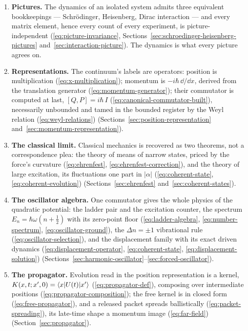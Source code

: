 \begin{enumerate}
    \item[\textbf{(P1)}] \textbf{Pictures.} The dynamics of an isolated system admits three equivalent bookkeepings --- Schr\"odinger, Heisenberg, Dirac interaction --- and every matrix element, hence every count of every experiment, is picture-independent (\eqref{eq:picture-invariance}, Sections~\ref{sec:schroedinger-heisenberg-pictures} and~\ref{sec:interaction-picture}). The dynamics is what every picture agrees on.
    \item[\textbf{(P2)}] \textbf{Representations.} The continuum's labels are operators: position is multiplication (\eqref{eq:x-multiplication}); momentum is $-i\hbar\,\dd/\dd x$, derived from the translation generator (\eqref{eq:momentum-generator}); their commutator is computed at last, $[Q,P] = i\hbar\,I$ (\eqref{eq:canonical-commutator-built}), necessarily unbounded and tamed in the bounded register by the Weyl relation (\eqref{eq:weyl-relations}) (Sections~\ref{sec:position-representation} and~\ref{sec:momentum-representation}).
    \item[\textbf{(P3)}] \textbf{The classical limit.} Classical mechanics is recovered as two theorems, not a correspondence plea: the theory of means of narrow states, priced by the force's curvature (\eqref{eq:ehrenfest}, \eqref{eq:ehrenfest-correction}), and the theory of large excitation, its fluctuations one part in $|\alpha|$ (\eqref{eq:coherent-state}, \eqref{eq:coherent-evolution}) (Sections~\ref{sec:ehrenfest} and~\ref{sec:coherent-states}).
    \item[\textbf{(P4)}] \textbf{The oscillator algebra.} One commutator gives the whole physics of the quadratic potential: the ladder pair and the excitation counter, the spectrum $E_n = \hbar\omega(n + \tfrac12)$ with its zero-point floor (\eqref{eq:ladder-algebra}, \eqref{eq:number-spectrum}, \eqref{eq:oscillator-ground}), the $\Delta n = \pm1$ vibrational rule (\eqref{eq:oscillator-selection}), and the displacement family with its exact driven dynamics (\eqref{eq:displacement-operator}, \eqref{eq:coherent-state}, \eqref{eq:displacement-solution}) (Sections~\ref{sec:harmonic-oscillator}--\ref{sec:forced-oscillator}).
    \item[\textbf{(P5)}] \textbf{The propagator.} Evolution read in the position representation is a kernel, $K(x, t; x', 0) = \braket{x|U(t)|x'}$ (\eqref{eq:propagator-def}), composing over intermediate positions (\eqref{eq:propagator-composition}); the free kernel is in closed form (\eqref{eq:free-propagator}), and a released packet spreads ballistically (\eqref{eq:packet-spreading}), its late-time shape a momentum image (\eqref{eq:far-field}) (Section~\ref{sec:propagator}).
\end{enumerate}

